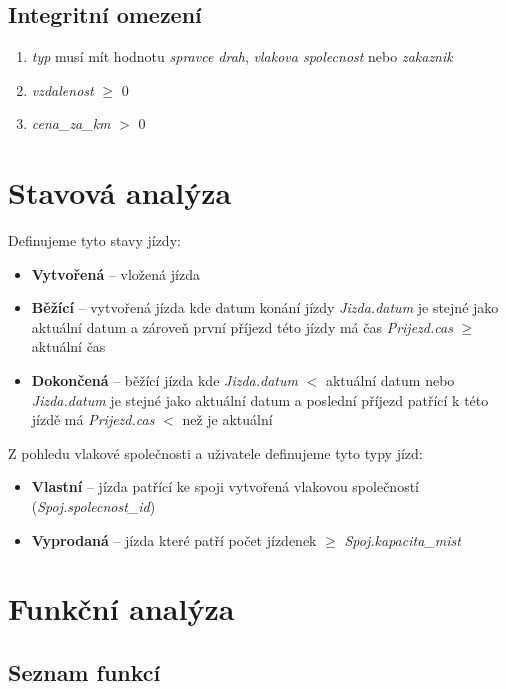 \documentclass[11pt]{article}
\begin{document}
\subsection{Integritní omezení}
\begin{enumerate}
    \item \textit{typ} musí mít hodnotu \textit{spravce drah}, \textit{vlakova spolecnost} nebo \textit{zakaznik}
    \item \textit{vzdalenost} $\geq$ 0
    \item \textit{cena\_za\_km} $>$ 0
\end{enumerate}

\section{Stavová analýza}
Definujeme tyto stavy jízdy:
\begin{itemize}
    \item \textbf{Vytvořená} – vložená jízda
    \item \textbf{Běžící} – vytvořená jízda kde datum konání jízdy \textit{Jizda.datum} je stejné jako aktuální datum a zároveň první příjezd této jízdy má čas \textit{Prijezd.cas} $\geq$ aktuální čas
    \item \textbf{Dokončená} – běžící jízda kde \textit{Jizda.datum} $<$ aktuální datum nebo \textit{Jizda.datum} je stejné jako aktuální datum a poslední příjezd patřící k této jízdě má \textit{Prijezd.cas} $<$ než je aktuální
\end{itemize}

\noindent
Z pohledu vlakové společnosti a uživatele definujeme tyto typy jízd:
\begin{itemize}
    \item \textbf{Vlastní} – jízda patřící ke spoji vytvořená vlakovou společností (\textit{Spoj.spolecnost\_id})
    \item \textbf{Vyprodaná} – jízda které patří počet jízdenek $\geq$ \textit{Spoj.kapacita\_mist}
\end{itemize}

\section{Funkční analýza}

\subsection{Seznam funkcí}

\renewcommand{\labelenumii}{\theenumii}
\renewcommand{\theenumii}{\theenumi.\arabic{enumii}.}
\end{document}
